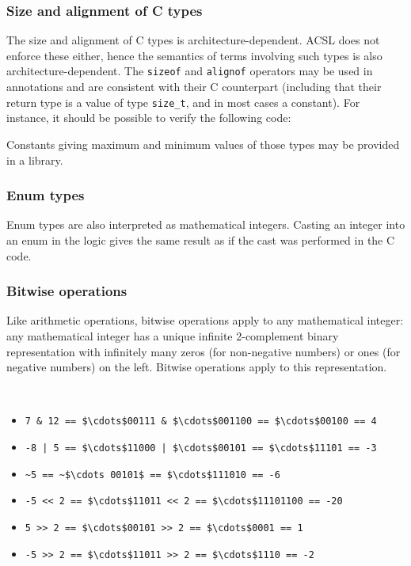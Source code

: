 \subsubsection{Size and alignment of C types}
\label{sec:sizeof-alignof}

The size and alignment of C types is architecture-dependent. ACSL does
not enforce these either, hence the semantics of terms involving
such types is also architecture-dependent. The
\lstinline|sizeof| and \lstinline|alignof|
operators may be used in annotations and are consistent with their C counterpart
(including that their return type is a value of type \lstinline|size_t|, and in
most cases a constant). For instance, it should be possible to verify the
following code:


Constants giving maximum and minimum values of those types may be
provided in a library.


\subsubsection{Enum types}

Enum types are also interpreted as mathematical integers. Casting
an integer into an enum in the logic gives the same result as
if the cast was performed in the C code.


\subsubsection{Bitwise operations}

Like arithmetic operations, bitwise operations apply to any
mathematical integer: any mathematical integer has a unique infinite
2-complement binary representation with infinitely many zeros (for
non-negative numbers) or ones (for negative numbers) on the left.
Bitwise operations apply to this representation.
\begin{example} ~
  \begin{itemize}
  \item \lstinline|7 & 12 == $\cdots$00111 & $\cdots$001100 == $\cdots$00100 == 4|
  \item \lstinline+-8 | 5 == $\cdots$11000 | $\cdots$00101 == $\cdots$11101 == -3+
  \item \lstinline+~5 == ~$\cdots 00101$ == $\cdots$111010 == -6+
  \item \lstinline+-5 << 2 == $\cdots$11011 << 2 == $\cdots$11101100 == -20+
  \item \lstinline+5 >> 2 == $\cdots$00101 >> 2 == $\cdots$0001 == 1+
  \item \lstinline+-5 >> 2 == $\cdots$11011 >> 2 == $\cdots$1110 == -2+
  \end{itemize}
\end{example}

